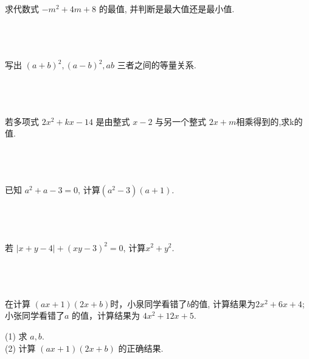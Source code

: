 \item {
    求代数式 $-m^2 + 4m + 8$ 的最值, 并判断是最大值还是最小值.
    \ifshowSolution
        \fangsong{}
        \\
    \else
        \\ \\ \\
    \fi
}

\item {
    写出 $(a+b)^2, (a-b)^2, ab$ 三者之间的等量关系.
    \ifshowSolution
        \fangsong{}
        \\
    \else
        \\ \\ \\
    \fi
}

\item {
    若多项式 $2x^2 + kx - 14$ 是由整式 $x-2$ 与另一个整式 $2x+m$相乘得到的,求k的值.
    \ifshowSolution
        \fangsong{}
        \\
    \else
        \\ \\ \\
    \fi
}

\item {
    已知 $a^2 + a - 3 = 0$, 计算$(a^2 - 3)(a+1)$.
    \ifshowSolution
        \fangsong{}
        \\
    \else
        \\ \\ \\
    \fi
}

\item {
    若 $\lvert x+y-4 \rvert + (xy-3)^2 = 0$, 计算$x^2 + y^2$.
    \ifshowSolution
        \fangsong{}
        \\
    \else
        \\ \\ \\
    \fi
}

\item {
    在计算 $(ax+1)(2x+b)$时，小泉同学看错了$b$的值, 计算结果为$2x^2 + 6x + 4$; 小张同学看错了$a$ 的值，计算结果为 $4x^2+12x+5$.

    (1) 求 $a,b$.\\
    (2) 计算 $(ax+1)(2x+b)$ 的正确结果.
    \ifshowSolution
        \fangsong{}
        \\
    \else
        \\ \\ \\ \\ 
    \fi
}
